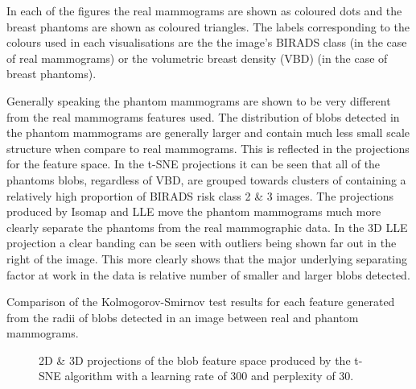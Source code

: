 In each of the figures the real mammograms are shown as coloured dots and the breast phantoms are shown as coloured triangles. The labels corresponding to the colours used in each visualisations are the the image's BIRADS class (in the case of real mammograms) or the volumetric breast density (VBD) (in the case of breast phantoms).

Generally speaking the phantom mammograms are shown to be very different from the real mammograms features used. The distribution of blobs detected in the phantom mammograms are generally larger and contain much less small scale structure when compare to real mammograms. This is reflected in the projections for the feature space. In the t-SNE projections it can be seen that all of the phantoms blobs, regardless of VBD, are grouped towards clusters of containing a relatively high proportion of BIRADS risk class 2 \& 3 images. The projections produced by Isomap and LLE move the phantom mammograms much more clearly separate the phantoms from the real mammographic data. In the 3D LLE projection a clear banding can be seen with outliers being shown far out in the right of the image. This more clearly shows that the major underlying separating factor at work in the data is relative number of smaller and larger blobs detected. 

\begin{table}[H]
\label{table:blob_features_ks}
\centering
{}
\caption{Comparison of the Kolmogorov-Smirnov test results for each feature generated from the radii of blobs detected in an image between real and phantom mammograms.}
\end{table}

\clearpage

\begin{figure}[H]
	\centering
	\caption{2D \& 3D projections of the blob feature space produced by the t-SNE algorithm with a learning rate of 300 and perplexity of 30.}\label{fig:blob_SNE_mapping}
\end{figure}

